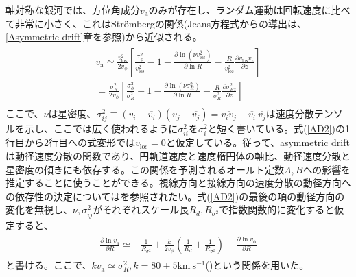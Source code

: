 軸対称な銀河では、方位角成分$v_{\mathrm{a}}$のみが存在し、ランダム運動は回転速度に比べて非常に小さく、これはStr\"{o}mbergの関係(Jeans方程式からの導出は\cite{BT2008}、\ref{Asymmetric drift}章を参照)から近似される。
\begin{align}
\begin{aligned}
    v_{\mathrm{a}} \simeq \frac{\overline{v_{\mathrm{los}}^2}}{2v_{\phi}} \left[\frac{\sigma_{\phi}^2}{\overline{v_{\mathrm{los}}^2}} - 1 - \frac{\partial \ln(\nu \overline{v_{\mathrm{los}}^2})}{\partial \ln R} - \frac{R}{\overline{v_{\mathrm{los}}^2}}\frac{\partial \overline{v_{\mathrm{los}} v_z}}{\partial z}\right] \\
    = \frac{\sigma_R^2}{2v_{\phi}} \left[\frac{\sigma_{\phi}^2}{\sigma_R^2} - 1 - \frac{\partial \ln(\nu \sigma_R^2)}{\partial \ln R} - \frac{R}{\sigma_R^2}\frac{\partial \sigma_{Rz}^2}{\partial z}\right]
\end{aligned} \label{AD2}
\end{align}
ここで、$\nu$は星密度、$\sigma_{ij}^2 \equiv \overline{(v_i-\overline{v_i})(v_j-\overline{v_j})}=\overline{v_i v_j}-\overline{v_i}\ \overline{v_j}$は速度分散テンソルを示し、ここでは広く使われるように$\sigma_{ii}^2$を$\sigma_i^2$と短く書いている。式(\ref{AD2})の1行目から2行目への式変形では$\overline{v_{\mathrm{los}}}=0$と仮定している。従って、asymmetric driftは動径速度分散の関数であり、円軌道速度と速度楕円体の軸比、動径速度分散と星密度の傾きにも依存する。この関係を予測されるオールト定数$A,B$への影響を推定することに使うことができる。視線方向と接線方向の速度分散の動径方向への依存性の決定については\cite{LF1989}を参照されたい。式(\ref{AD2})の最後の項の動径方向の変化を無視し、$\nu,\sigma_{ij}^2$がそれぞれスケール長$R_d,R_{\sigma^2}$で指数関数的に変化すると仮定すると、
\begin{align}
\begin{aligned}
    \frac{\partial \ln v_{\mathrm{a}}}{\partial R} \simeq -\frac{1}{R_{\sigma^2}} + \frac{k}{2v_{\phi}}\left(\frac{1}{R_d} + \frac{1}{R_{\sigma^2}}\right) - \frac{\partial \ln v_{\phi}}{\partial R}
\end{aligned} \label{AD3}
\end{align}
と書ける。ここで、$kv_{\mathrm{a}} \simeq \sigma_{R}^2, k=80 \pm 5 \mathrm{km\ s^{-1}}$(\cite{DB1998})という関係を用いた。

